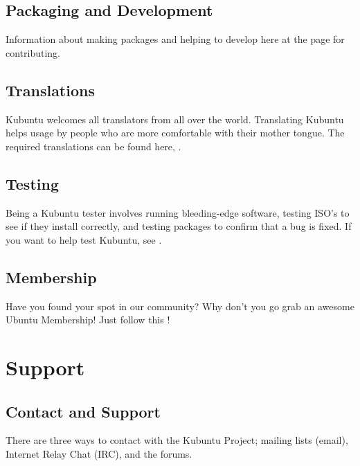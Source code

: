 \documentclass[letterpaper,10pt,english]{sphinxmanual}
\begin{document}
\section{Packaging and Development}
\label{\detokenize{docs/contribute:packaging-and-development}}
Information about making packages and helping to develop here at the {\hyperref[\detokenize{docs/packaging_guide/welcome:contribute-dev-link}]{}} page for contributing.


\section{Translations}
\label{\detokenize{docs/contribute:translations}}
Kubuntu welcomes all translators from all over the world. Translating Kubuntu helps usage by people who are more comfortable with their mother tongue. The required translations can be found here, .


\section{Testing}
\label{\detokenize{docs/contribute:testing}}
Being a Kubuntu tester involves running bleeding-edge software, testing ISO’s to see if they install correctly, and testing packages to confirm that a bug is fixed. If you want to help test Kubuntu, see .


\section{Membership}
\label{\detokenize{docs/contribute:membership}}
Have you found your spot in our community? Why don’t you go grab an awesome Ubuntu Membership! Just follow this !

{\hyperref[\detokenize{docs/contribute:contribute}]{}}


\chapter{Support}
\label{\detokenize{docs/support:support}}\label{\detokenize{docs/support:support-link}}\label{\detokenize{docs/support::doc}}

\section{Contact and Support}
\label{\detokenize{docs/support:contact-and-support}}
There are three ways to contact with the Kubuntu Project; mailing lists (email), Internet Relay Chat (IRC), and the forums.
\end{document}
